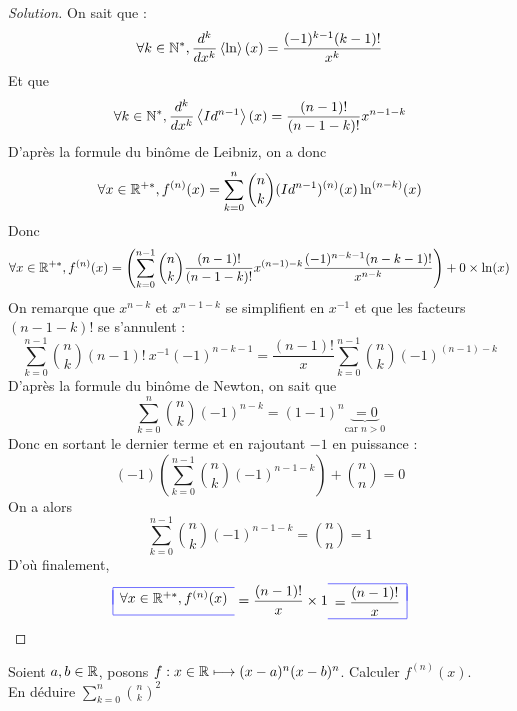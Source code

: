 \documentclass{classe}
\newcommand{\lboxed}[1]{{\color{blue}\begin{array}{|l}\hline\\[-2.4ex]{\color{black}#1}\\[1.2ex]\hline\end{array}}}
\newcommand{\rboxed}[1]{{\color{blue}\begin{array}{r|}\hline\\[-2.4ex]{\color{black}#1}\\[1.2ex]\hline\end{array}}}
\newenvironment{solution}
  {\renewcommand\qedsymbol{$\blacksquare$}\begin{proof}[Solution]}
  {\end{proof}}
\begin{document}
\begin{solution}
On sait que :
\[
\forall k \in \mathbb{N}^*, \dfrac{d^k}{dx^k}\left\langle\ln\right\rangle(x) = \dfrac{(-1)^{k-1}(k-1)!}{x^k}
\]
Et que 
\[
\forall k \in \mathbb{N}^*, \dfrac{d^k}{dx^k}\left\langle Id^{n-1} \right\rangle(x) = \dfrac{(n-1)!}{(n-1-k)!} x^{n-1-k}
\]
D'après la formule du binôme de Leibniz, on a donc
\[
\forall x \in \mathbb{R}^{+*}, 
f^{(n)}(x)
= \displaystyle\sum\limits_{k=0}^{n} \binom{n}{k} (Id^{n-1})^{(n)}(x) \ln^{(n-k)}(x)
\]
Donc 
\[
\forall x \in \mathbb{R}^{+*}, 
f^{(n)}(x)
= \left(\displaystyle\sum\limits_{k=0}^{n-1} \binom{n}{k} \dfrac{(n-1)!}{(n-1-k)!} x^{(n-1)-k} \dfrac{(-1)^{n-k-1}(n-k-1)!}{x^{n-k}}\right) + 0 \times \ln(x)
\]
On remarque que $x^{n-k}$ et $x^{n-1-k}$ se simplifient en $x^{-1}$ et que les facteurs $(n-1-k)!$ se s'annulent :
\[
\displaystyle\sum\limits_{k=0}^{n-1} \binom{n}{k} (n-1)! \: x^{-1} (-1)^{n-k-1}
= \dfrac{(n-1)!}{x} \displaystyle\sum\limits_{k=0}^{n-1} \binom{n}{k} (-1)^{(n-1)-k}
\]
D'après la formule du binôme de Newton, on sait que 
\[
\displaystyle\sum\limits_{k=0}^{n} \binom{n}{k} (-1)^{n-k} = (1-1)^n \underbrace{= 0}_{\text{car $n > 0$}}
\]
Donc en sortant le dernier terme et en rajoutant $-1$ en puissance :
\[
(-1)\left(\displaystyle\sum\limits_{k=0}^{n-1} \binom{n}{k} (-1)^{n-1-k}\right) + \binom{n}{n} = 0
\]
On a alors 
\[
\displaystyle\sum\limits_{k=0}^{n-1} \binom{n}{k} (-1)^{n-1-k} = \binom{n}{n} = 1
\]
D'où finalement, 
\[
\lboxed{\forall x \in \setRealNumbers^{+*}, 
f^{(n)}(x)}
= \dfrac{(n-1)!}{x} \times 1 
\rboxed{= \dfrac{(n-1)!}{x}}
\] 
\end{solution}

\begin{exercice}
Soient $a,b\in\mathbb{R}$, posons $\function[f]{x\in\setRealNumbers}{(x-a)^n (x-b)^n}$. Calculer $f^{(n)}(x)$.\\
En déduire $\displaystyle\sum\limits_{k=0}^{n} \binom{n}{k}^2$
\end{exercice}
\end{document}

